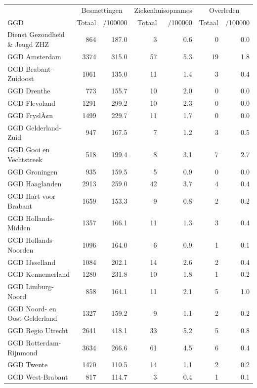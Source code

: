 \documentclass[
  english,
  man,floatsintext]{apa6}
\begin{document}
\begin{table}
\centering\begingroup\fontsize{10}{12}\selectfont

\begin{threeparttable}
\begin{tabular}{lrrrrrr}
\toprule
\multicolumn{1}{c}{ } & \multicolumn{2}{c}{Besmettingen} & \multicolumn{2}{c}{Ziekenhuisopnames} & \multicolumn{2}{c}{Overleden} \\
\cmidrule(l{3pt}r{3pt}){2-3} \cmidrule(l{3pt}r{3pt}){4-5} \cmidrule(l{3pt}r{3pt}){6-7}
GGD & Totaal & /100000 & Totaal & /100000 & Totaal & /100000\\
\midrule
Dienst Gezondheid \& Jeugd ZHZ & 864 & 187.0 & 3 & 0.6 & 0 & 0.0\\
GGD Amsterdam & 3374 & 315.0 & 57 & 5.3 & 19 & 1.8\\
GGD Brabant-Zuidoost & 1061 & 135.0 & 11 & 1.4 & 3 & 0.4\\
GGD Drenthe & 773 & 155.7 & 10 & 2.0 & 0 & 0.0\\
GGD Flevoland & 1291 & 299.2 & 10 & 2.3 & 0 & 0.0\\
GGD FryslÃ¢n & 1499 & 229.7 & 11 & 1.7 & 0 & 0.0\\
GGD Gelderland-Zuid & 947 & 167.5 & 7 & 1.2 & 3 & 0.5\\
GGD Gooi en Vechtstreek & 518 & 199.4 & 8 & 3.1 & 7 & 2.7\\
GGD Groningen & 935 & 159.5 & 5 & 0.9 & 0 & 0.0\\
GGD Haaglanden & 2913 & 259.0 & 42 & 3.7 & 4 & 0.4\\
GGD Hart voor Brabant & 1659 & 153.3 & 9 & 0.8 & 2 & 0.2\\
GGD Hollands-Midden & 1357 & 166.1 & 11 & 1.3 & 3 & 0.4\\
GGD Hollands-Noorden & 1096 & 164.0 & 6 & 0.9 & 1 & 0.1\\
GGD IJsselland & 1084 & 202.1 & 14 & 2.6 & 2 & 0.4\\
GGD Kennemerland & 1280 & 231.8 & 10 & 1.8 & 1 & 0.2\\
GGD Limburg-Noord & 858 & 164.1 & 11 & 2.1 & 5 & 1.0\\
GGD Noord- en Oost-Gelderland & 1327 & 159.2 & 9 & 1.1 & 2 & 0.2\\
GGD Regio Utrecht & 2641 & 418.1 & 33 & 5.2 & 5 & 0.8\\
GGD Rotterdam-Rijnmond & 3634 & 266.6 & 61 & 4.5 & 6 & 0.4\\
GGD Twente & 1470 & 110.5 & 14 & 1.1 & 2 & 0.2\\
GGD West-Brabant & 817 & 114.7 & 3 & 0.4 & 1 & 0.1\\

\end{tabular}
\end{threeparttable}
\end{table}
\end{document}
